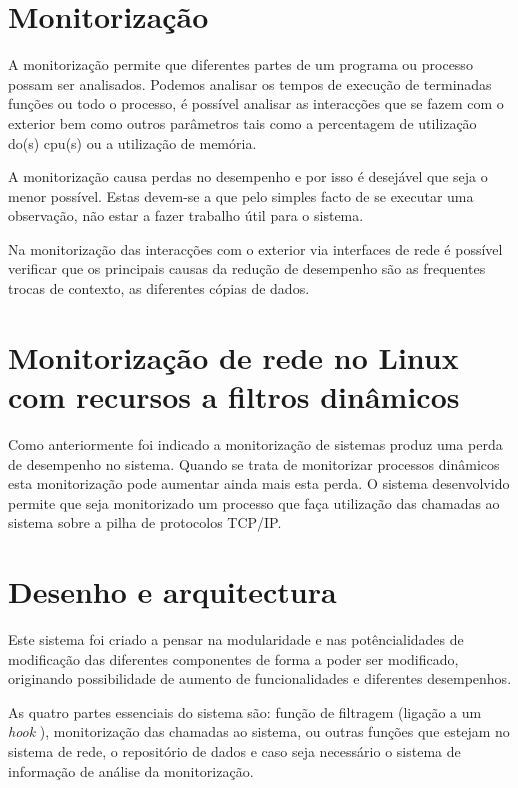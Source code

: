 \documentclass[runningheads,a4paper]{llncs}
\begin{document}
\section{Monitorização}
\label{sec:mon_intro}


A monitorização permite que diferentes partes de um programa ou processo possam ser analisados. Podemos analisar os tempos de execução de terminadas funções ou todo o processo, é possível analisar as interacções que se fazem com o exterior bem como outros parâmetros tais como a percentagem de utilização do(s) cpu(s) ou a utilização de memória.

A monitorização causa perdas no desempenho e por isso é desejável que seja o menor possível. Estas devem-se a que pelo simples facto de se executar uma observação, não estar a fazer trabalho útil para o sistema.

Na monitorização das interacções com o exterior via interfaces de rede é possível verificar que os principais causas da redução de desempenho são as frequentes trocas de contexto, as diferentes cópias de dados.


\section{Monitorização de rede no Linux com recursos a filtros dinâmicos}
\label{sec:mon_network__with_dynamic_filters_linux}

Como anteriormente foi indicado a monitorização de sistemas produz uma perda de desempenho no sistema. Quando se trata de monitorizar processos dinâmicos esta monitorização pode aumentar ainda mais esta perda. O sistema desenvolvido permite que seja monitorizado um processo que faça utilização das chamadas ao sistema sobre a pilha de protocolos TCP/IP.


\section{Desenho e arquitectura}
\label{sec:architecture}

Este sistema foi criado a pensar na modularidade e nas potêncialidades de modificação das diferentes componentes de forma a poder ser modificado, originando possibilidade de aumento de funcionalidades e diferentes desempenhos.

As quatro partes essenciais do sistema são: função de filtragem (ligação a um \textit{hook} ), monitorização das chamadas ao sistema, ou outras funções que estejam no sistema de rede, o repositório de dados e caso seja necessário o sistema de informação de análise da monitorização.
\end{document}
